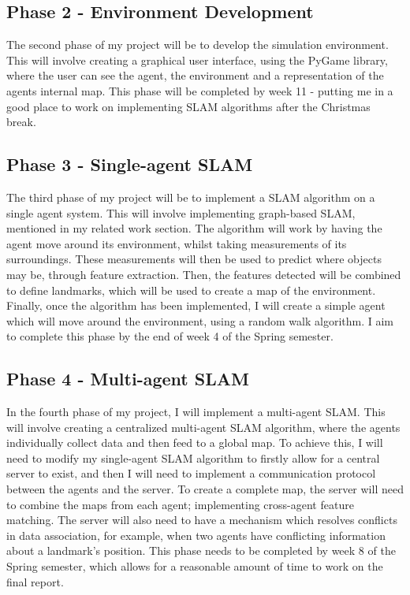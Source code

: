 \documentclass[12pt]{article}
\begin{document}
\subsection{Phase 2 - Environment Development}
The second phase of my project will be to develop the simulation environment. This will involve creating a graphical user
interface, using the PyGame library, where the user can see the agent, the environment and a representation of the agents
internal map. This phase will be completed by week 11 - putting me in a good place to work on implementing SLAM algorithms
after the Christmas break.

\subsection{Phase 3 - Single-agent SLAM}
The third phase of my project will be to implement a SLAM algorithm on a single agent system. This will involve implementing
graph-based SLAM, mentioned in my related work section. The algorithm will work by having the agent move around its environment,
whilst taking measurements of its surroundings. These measurements will then be used to predict where objects may be, through
feature extraction. Then, the features detected will be combined to define landmarks, which will be used to create a map of
the environment. Finally, once the algorithm has been implemented, I will create a simple agent which will move around the
environment, using a random walk algorithm. I aim to complete this phase by the end of week 4 of the Spring semester.


\subsection{Phase 4 - Multi-agent SLAM}
In the fourth phase of my project, I will implement a multi-agent SLAM. This will involve creating a centralized multi-agent
SLAM algorithm, where the agents individually collect data and then feed to a global map. To achieve this, I will need to
modify my single-agent SLAM algorithm to firstly allow for a central server to exist, and then I will need to implement a
communication protocol between the agents and the server. To create a complete map, the server will need to combine the maps
from each agent; implementing cross-agent feature matching. The server will also need to have a mechanism which resolves conflicts
in data association, for example, when two agents have conflicting information about a landmark's position. This phase needs
to be completed by week 8 of the Spring semester, which allows for a reasonable amount of time to work on the final report.
\end{document}
